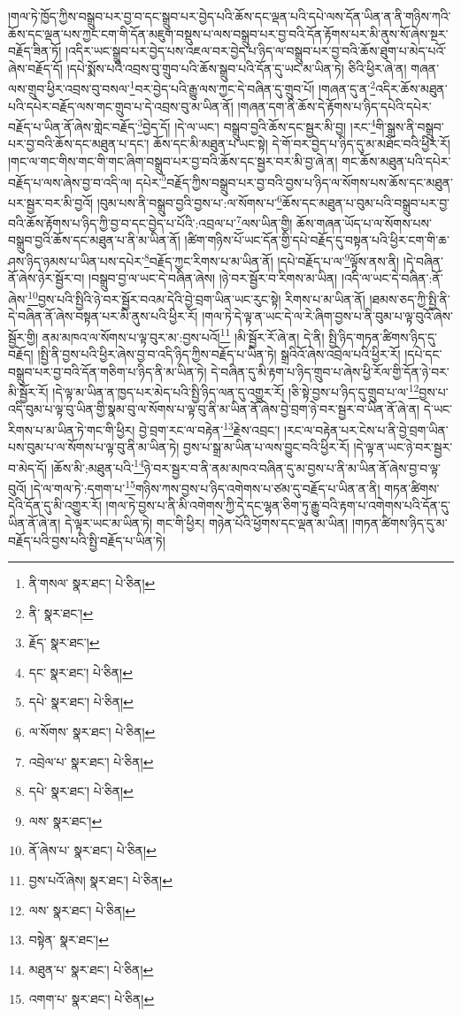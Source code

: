 །གལ་ཏེ་ཁྱོད་ཀྱིས་བསྒྲུབ་པར་བྱ་བ་དང་སྒྲུབ་པར་བྱེད་པའི་ཆོས་དང་ལྡན་པའི་དཔེ་ལས་དོན་ཡིན་ན་ནི་གཉིས་ཀའི་ཆོས་དང་ལྡན་པས་ཀྱང་ངག་གི་དོན་མཇུག་བསྡུས་པ་ལས་བསྒྲུབ་པར་བྱ་བའི་དོན་རྟོགས་པར་མི་ནུས་སོ་ཞེས་སྔར་བརྗོད་ཟིན་ཏོ། །འདིར་ཡང་སྒྲུབ་པར་བྱེད་པས་འཇལ་བར་བྱེད་པ་ཉིད་ལ་བསྒྲུབ་པར་བྱ་བའི་ཆོས་ཐུག་པ་མེད་པའོ་ཞེས་བརྗོད་དོ། །དཔེ་སྨོས་པའི་འབྲས་བུ་གྲུབ་པའི་ཆོས་སྒྲུབ་པའི་དོན་དུ་ཡང་མ་ཡིན་ཏེ། ཅིའི་ཕྱིར་ཞེ་ན། གཞན་ལས་གྲུབ་ཕྱིར་འབྲས་བུ་བསལ་\footnote{ནི་གསལ་  སྣར་ཐང་།  པེ་ཅིན། }བར་བྱེད་པའི་རྒྱུ་ལས་ཀྱང་དེ་བཞིན་དུ་གྲུབ་པོ། །གཞན་དུ་ན་\footnote{ནི་  སྣར་ཐང་། }འདིར་ཆོས་མཐུན་པའི་དཔེར་བརྗོད་ལས་གང་གྲུབ་པ་དེ་འབྲས་བུ་མ་ཡིན་ནོ། །གཞན་དག་ནི་ཆོས་དེ་རྟོགས་པ་ཉིད་དཔེའི་དཔེར་བརྗོད་པ་ཡིན་ནོ་ཞེས་གླེང་བརྗོད་\footnote{རྗོད་  སྣར་ཐང་། }བྱེད་དོ། །དེ་ལ་ཡང་། བསྒྲུབ་བྱའི་ཆོས་དང་སྦྱར་མི་བྱ། །རང་\footnote{དང་  སྣར་ཐང་།  པེ་ཅིན། }གི་སྒྲས་ནི་བསྒྲུབ་པར་བྱ་བའི་ཆོས་དང་མཐུན་པ་དང་། ཆོས་དང་མི་མཐུན་པ་ཡང་སྟེ། དེ་གོ་བར་བྱེད་པ་ཉིད་དུ་མ་མཐོང་བའི་ཕྱིར་རོ། །གང་ལ་གང་གིས་གང་གི་གང་ཞིག་བསྒྲུབ་པར་བྱ་བའི་ཆོས་དང་སྦྱར་བར་མི་བྱ་ཞེ་ན། གང་ཆོས་མཐུན་པའི་དཔེར་བརྗོད་པ་ལས་ཞེས་བྱ་བ་འདི་ལ། དཔེར་\footnote{དཔེ་  སྣར་ཐང་།  པེ་ཅིན། }བརྗོད་ཀྱིས་བསྒྲུབ་པར་བྱ་བའི་བྱས་པ་ཉིད་ལ་སོགས་པས་ཆོས་དང་མཐུན་པར་སྦྱར་བར་མི་བྱའོ། །བུམ་པས་ནི་བསྒྲུབ་བྱའི་བྱས་པ་:ལ་སོགས་པ་\footnote{ལ་སོགས་  སྣར་ཐང་།  པེ་ཅིན། }ཆོས་དང་མཐུན་པ་བུམ་པའི་བསྒྲུབ་པར་བྱ་བའི་ཆོས་རྟོགས་པ་ཉིད་ཀྱི་བྱ་བ་དང་བྱེད་པ་པོའི་:འབྲལ་པ་\footnote{འབྲེལ་པ་  སྣར་ཐང་།  པེ་ཅིན། }ལས་ཡིན་གྱི། ཆོས་གཞན་ཡོད་པ་ལ་སོགས་པས་བསྒྲུབ་བྱའི་ཆོས་དང་མཐུན་པ་ནི་མ་ཡིན་ནོ། །ཚིག་གཉིས་པོ་ཡང་དོན་གྱི་དཔེ་བརྗོད་དུ་བསྟན་པའི་ཕྱིར་ངག་གི་ཆ་ཤས་ཉིད་ཉམས་པ་ཡིན་པས་དཔེར་\footnote{དཔེ་  སྣར་ཐང་།  པེ་ཅིན། }བརྗོད་ཀྱང་རིགས་པ་མ་ཡིན་ནོ། །དཔེ་བརྗོད་པ་ལ་\footnote{ལས་  སྣར་ཐང་། }ལྟོས་ནས་ནི། །དེ་བཞིན་ནོ་ཞེས་ཉེར་སྦྱོར་བ། །བསྒྲུབ་བྱ་ལ་ཡང་དེ་བཞིན་ཞེས། །ཉེ་བར་སྦྱོར་བ་རིགས་མ་ཡིན། །འདི་ལ་ཡང་དེ་བཞིན་:ནོ་ཞེས་\footnote{ནོ་ཞེས་པ་  སྣར་ཐང་།  པེ་ཅིན། }བྱས་པའི་སྤྱིའི་ཉེ་བར་སྦྱོར་བའམ་དེའི་བྱེ་བྲག་ཡིན་ཡང་རུང་སྟེ། རིགས་པ་མ་ཡིན་ནོ། །ཐམས་ཅད་ཀྱི་སྤྱི་ནི་དེ་བཞིན་ནོ་ཞེས་བསྟན་པར་མི་ནུས་པའི་ཕྱིར་རོ། །གལ་ཏེ་དེ་ལྟ་ན་ཡང་དེ་ལ་རེ་ཞིག་བྱས་པ་ནི་བུམ་པ་ལྟ་བུའོ་ཞེས་སྦྱོར་གྱི། ནམ་མཁའ་ལ་སོགས་པ་ལྟ་བུར་མ་:བྱས་པའོ།\footnote{བྱས་པའོ་ཞེས།  སྣར་ཐང་།  པེ་ཅིན། } །མི་སྦྱོར་རོ་ཞེ་ན། དེ་ནི། སྤྱི་ཉིད་གཏན་ཚིགས་ཉིད་དུ་བརྗོད། །སྤྱི་ནི་བྱས་པའི་ཕྱིར་ཞེས་བྱ་བ་འདི་ཉིད་ཀྱིས་བརྗོད་པ་ཡིན་ཏེ། སྒྲའིའོ་ཞེས་འབྲེལ་པའི་ཕྱིར་རོ། །དཔེ་དང་བསྒྲུབ་པར་བྱ་བའི་དོན་གཅིག་པ་ཉིད་ནི་མ་ཡིན་ཏེ། དེ་བཞིན་དུ་མི་རྟག་པ་ཉིད་གྲུབ་པ་ཞེས་ཕྱི་རོལ་གྱི་དོན་ཉེ་བར་མི་སྦྱོར་རོ། །དེ་ལྟ་མ་ཡིན་ན་ཁྱད་པར་མེད་པའི་སྤྱི་ཉིད་ལན་དུ་འགྱུར་རོ། །ཅི་སྟེ་བྱས་པ་ཉིད་དུ་གྲུབ་པ་ལ་\footnote{ལས་  སྣར་ཐང་།  པེ་ཅིན། }བྱས་པ་འདི་བུམ་པ་ལྟ་བུ་ཡིན་གྱི་སྣམ་བུ་ལ་སོགས་པ་ལྟ་བུ་ནི་མ་ཡིན་ནོ་ཞེས་བྱེ་བྲག་ཉེ་བར་སྦྱར་བ་ཡིན་ནོ་ཞེ་ན། དེ་ཡང་རིགས་པ་མ་ཡིན་ཏེ་གང་གི་ཕྱིར། བྱེ་བྲག་རང་ལ་བརྟེན་\footnote{བསྟེན་  སྣར་ཐང་། }རྗེས་འབྲང་། །རང་ལ་བརྟེན་པར་ངེས་པ་ནི་བྱེ་བྲག་ཡིན་པས་བུམ་པ་ལ་སོགས་པ་ལྟ་བུ་ནི་མ་ཡིན་ཏེ། བྱས་པ་སྒྲ་མ་ཡིན་པ་ལས་བྱུང་བའི་ཕྱིར་རོ། །དེ་ལྟ་ན་ཡང་ཉེ་བར་སྦྱར་བ་མེད་དོ། །ཆོས་མི་:མཐུན་པའི་\footnote{མཐུན་པ་  སྣར་ཐང་།  པེ་ཅིན། }ཉེ་བར་སྦྱར་བ་ནི་ནམ་མཁའ་བཞིན་དུ་མ་བྱས་པ་ནི་མ་ཡིན་ནོ་ཞེས་བྱ་བ་ལྟ་བུའོ། །དེ་ལ་གལ་ཏེ་:དགག་པ་\footnote{འགག་པ་  སྣར་ཐང་།  པེ་ཅིན། }གཉིས་ཀས་བྱས་པ་ཉིད་འགེགས་པ་ཙམ་དུ་བརྗོད་པ་ཡིན་ན་ནི། གཏན་ཚིགས་དེའི་དོན་དུ་མི་འགྱུར་རོ། །གལ་ཏེ་བྱས་པ་ནི་མི་འགེགས་ཀྱི་དེ་དང་ལྷན་ཅིག་ཏུ་རྒྱུ་བའི་རྟག་པ་འགེགས་པའི་དོན་དུ་ཡིན་ནོ་ཞེ་ན། དེ་ལྟར་ཡང་མ་ཡིན་ཏེ། གང་གི་ཕྱིར། གཉེན་པོའི་ཕྱོགས་དང་ལྡན་མ་ཡིན། །གཏན་ཚིགས་ཉིད་དུ་མ་བརྗོད་པའི་བྱས་པའི་སྤྱི་བརྗོད་པ་ཡིན་ཏེ། 